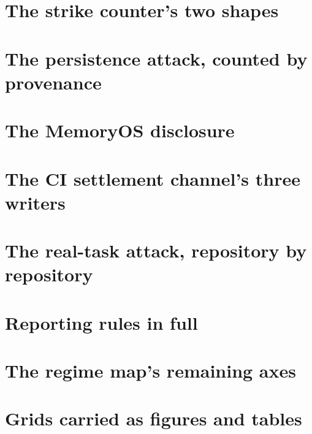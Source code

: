 \ifdefined\bodyonly
\section{The strike counter's two shapes}
\label{sec:sweepshapes}


\section{The persistence attack, counted by provenance}
\label{sec:persistcounters}


\section{The MemoryOS disclosure}
\label{sec:disclosure}


\section{The CI settlement channel's three writers}
\label{sec:cichannel}


\section{The real-task attack, repository by repository}
\label{sec:attacktransfer}


\section{Reporting rules in full}
\label{sec:reporting-full}


\section{The regime map's remaining axes}
\label{sec:axes}


\section{Grids carried as figures and tables}
\label{sec:extrafloats}




